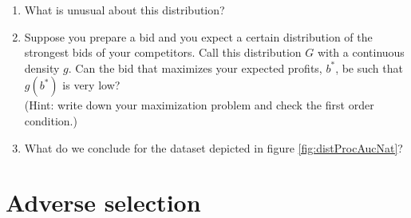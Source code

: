 \documentclass[a4paper,12pt]{article}
\begin{document}
\begin{enumerate}[resume]
    \begin{enumerate}
    \item What is unusual about this distribution?
    \item Suppose you prepare a bid and you expect a certain distribution of the strongest bids of your competitors. Call this distribution $G$ with a continuous density $g$. Can the bid that maximizes your expected profits, $b^*$, be such that $g(b^*)$ is very low?\\
      (Hint: write down your maximization problem and check the first order condition.)
      
    \item What do we conclude for the dataset depicted in figure \ref{fig:distProcAucNat}?
    \end{enumerate}
\end{enumerate}

\section{Adverse selection}
\label{sec:adverse-selection}
\end{document}
